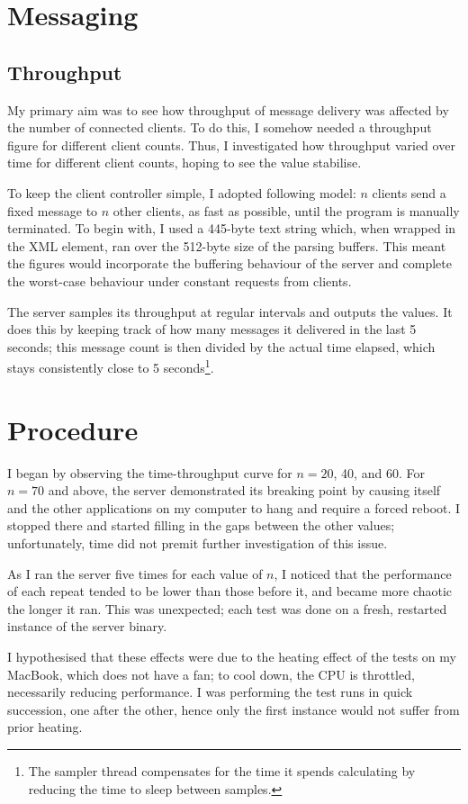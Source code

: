 \section{Messaging}
\subsection{Throughput}
My primary aim was to see how throughput of message delivery was affected by the number of connected clients. To do this, I somehow needed a throughput figure for different client counts. Thus, I investigated how throughput varied over time for different client counts, hoping to see the value stabilise.

To keep the client controller simple, I adopted following model: $n$ clients send a fixed message to $n$ other clients, as fast as possible, until the program is manually terminated. To begin with, I used a 445-byte text string which, when wrapped in the XML  element, ran over the 512-byte size of the parsing buffers. This meant the figures would incorporate the buffering behaviour of the server and complete the worst-case behaviour under constant requests from clients.

The server samples its throughput at regular intervals and outputs the values. It does this by keeping track of how many messages it delivered in the last 5 seconds; this message count is then divided by the actual time elapsed, which stays consistently close to 5 seconds\footnote{The sampler thread compensates for the time it spends calculating by reducing the time to sleep between samples. }.

\section{Procedure}
I began by observing the time-throughput curve for $n=20$, 40, and 60. For $n=70$ and above, the server demonstrated its breaking point by causing itself and the other applications on my computer to hang and require a forced reboot. I stopped there and started filling in the gaps between the other values; unfortunately, time did not premit further investigation of this issue.

As I ran the server five times for each value of $n$, I noticed that the performance of each repeat tended to be lower than those before it, and became more chaotic the longer it ran. This was unexpected; each test was done on a fresh, restarted instance of the server binary.

I hypothesised that these effects were due to the heating effect of the tests on my MacBook, which does not have a fan; to cool down, the CPU is throttled, necessarily reducing performance. I was performing the test runs in quick succession, one after the other, hence only the first instance would not suffer from prior heating.

